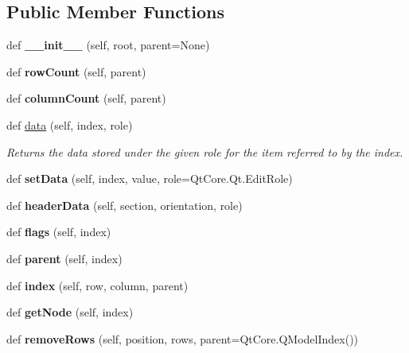 \subsection*{Public Member Functions}
\begin{DoxyCompactItemize}
\item 
\hypertarget{a00083_a7961b552537902b9236c2ded9cbfbc63}{}\label{a00083_a7961b552537902b9236c2ded9cbfbc63} 
def {\bfseries \+\_\+\+\_\+init\+\_\+\+\_\+} (self, root, parent=None)
\item 
\hypertarget{a00083_a44b390eef57be2a4883c1e6599b5a8ca}{}\label{a00083_a44b390eef57be2a4883c1e6599b5a8ca} 
def {\bfseries row\+Count} (self, parent)
\item 
\hypertarget{a00083_a132b1b7d95f07cae505b40b7fdeb4545}{}\label{a00083_a132b1b7d95f07cae505b40b7fdeb4545} 
def {\bfseries column\+Count} (self, parent)
\item 
\hypertarget{a00083_a2f7291849d0efb3d7cff499d1cde0bf6}{}\label{a00083_a2f7291849d0efb3d7cff499d1cde0bf6} 
def \hyperlink{a00083_a2f7291849d0efb3d7cff499d1cde0bf6}{data} (self, index, role)
\begin{DoxyCompactList}\small\item\em Returns the data stored under the given role for the item referred to by the index. \end{DoxyCompactList}\item 
\hypertarget{a00083_a9d7790fb94587e15b2c1b77a01e7845c}{}\label{a00083_a9d7790fb94587e15b2c1b77a01e7845c} 
def {\bfseries set\+Data} (self, index, value, role=Qt\+Core.\+Qt.\+Edit\+Role)
\item 
\hypertarget{a00083_a6a1656f6697b334ba6112c194cf04611}{}\label{a00083_a6a1656f6697b334ba6112c194cf04611} 
def {\bfseries header\+Data} (self, section, orientation, role)
\item 
\hypertarget{a00083_ad60d9395ff571be3fcf12411886f8bcf}{}\label{a00083_ad60d9395ff571be3fcf12411886f8bcf} 
def {\bfseries flags} (self, index)
\item 
\hypertarget{a00083_afa98c784f58d15bdb49c9ba85854ae03}{}\label{a00083_afa98c784f58d15bdb49c9ba85854ae03} 
def {\bfseries parent} (self, index)
\item 
\hypertarget{a00083_a3c52ee6daea1dc2ce7bb23833c761ed2}{}\label{a00083_a3c52ee6daea1dc2ce7bb23833c761ed2} 
def {\bfseries index} (self, row, column, parent)
\item 
\hypertarget{a00083_ad19222ac3eb114c51dce157ae50b2e19}{}\label{a00083_ad19222ac3eb114c51dce157ae50b2e19} 
def {\bfseries get\+Node} (self, index)
\item 
\hypertarget{a00083_aa80631169f93be117b17729ae8fa7bf6}{}\label{a00083_aa80631169f93be117b17729ae8fa7bf6} 
def {\bfseries remove\+Rows} (self, position, rows, parent=Qt\+Core.\+Q\+Model\+Index())
\end{DoxyCompactItemize}


